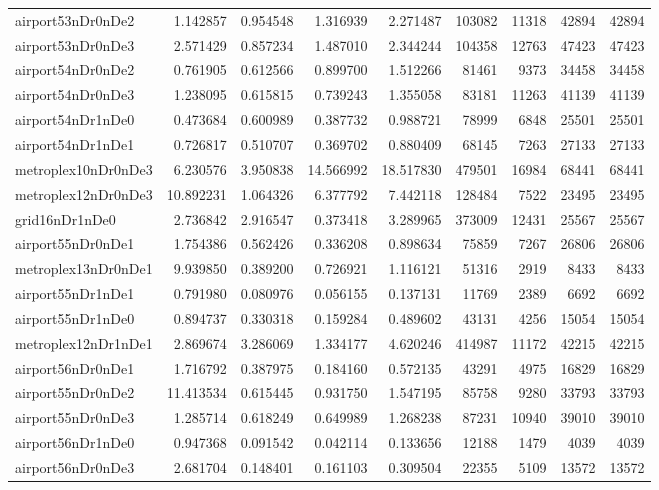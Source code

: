 \documentclass[../../../thesis.tex]{subfiles}
\begin{document}
\begin{longtable}{|l|r|r|r|r|r|r|r|r|}
airport53nDr0nDe2 & 1.142857 & 0.954548 & 1.316939 & 2.271487 & 103082 & 11318 & 42894 & 42894 \\
airport53nDr0nDe3 & 2.571429 & 0.857234 & 1.487010 & 2.344244 & 104358 & 12763 & 47423 & 47423 \\
airport54nDr0nDe2 & 0.761905 & 0.612566 & 0.899700 & 1.512266 & 81461 & 9373 & 34458 & 34458 \\
airport54nDr0nDe3 & 1.238095 & 0.615815 & 0.739243 & 1.355058 & 83181 & 11263 & 41139 & 41139 \\
airport54nDr1nDe0 & 0.473684 & 0.600989 & 0.387732 & 0.988721 & 78999 & 6848 & 25501 & 25501 \\
airport54nDr1nDe1 & 0.726817 & 0.510707 & 0.369702 & 0.880409 & 68145 & 7263 & 27133 & 27133 \\
metroplex10nDr0nDe3 & 6.230576 & 3.950838 & 14.566992 & 18.517830 & 479501 & 16984 & 68441 & 68441 \\
metroplex12nDr0nDe3 & 10.892231 & 1.064326 & 6.377792 & 7.442118 & 128484 & 7522 & 23495 & 23495 \\
grid16nDr1nDe0 & 2.736842 & 2.916547 & 0.373418 & 3.289965 & 373009 & 12431 & 25567 & 25567 \\
airport55nDr0nDe1 & 1.754386 & 0.562426 & 0.336208 & 0.898634 & 75859 & 7267 & 26806 & 26806 \\
metroplex13nDr0nDe1 & 9.939850 & 0.389200 & 0.726921 & 1.116121 & 51316 & 2919 & 8433 & 8433 \\
airport55nDr1nDe1 & 0.791980 & 0.080976 & 0.056155 & 0.137131 & 11769 & 2389 & 6692 & 6692 \\
airport55nDr1nDe0 & 0.894737 & 0.330318 & 0.159284 & 0.489602 & 43131 & 4256 & 15054 & 15054 \\
metroplex12nDr1nDe1 & 2.869674 & 3.286069 & 1.334177 & 4.620246 & 414987 & 11172 & 42215 & 42215 \\
airport56nDr0nDe1 & 1.716792 & 0.387975 & 0.184160 & 0.572135 & 43291 & 4975 & 16829 & 16829 \\
airport55nDr0nDe2 & 11.413534 & 0.615445 & 0.931750 & 1.547195 & 85758 & 9280 & 33793 & 33793 \\
airport55nDr0nDe3 & 1.285714 & 0.618249 & 0.649989 & 1.268238 & 87231 & 10940 & 39010 & 39010 \\
airport56nDr1nDe0 & 0.947368 & 0.091542 & 0.042114 & 0.133656 & 12188 & 1479 & 4039 & 4039 \\
airport56nDr0nDe3 & 2.681704 & 0.148401 & 0.161103 & 0.309504 & 22355 & 5109 & 13572 & 13572 \\

\end{longtable}
\end{document}

